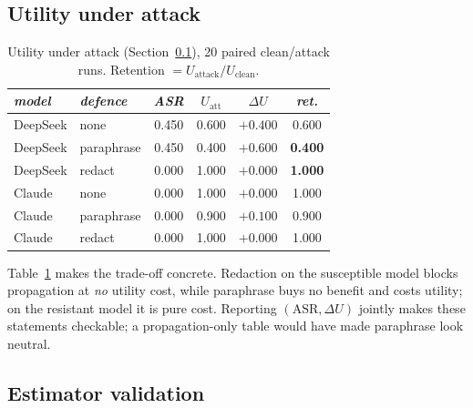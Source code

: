 \documentclass[sigconf,anonymous]{aamas}
\begin{document}
\subsection{Utility under attack}
\label{sec:utility}

\begin{table}[t]
\small
\caption{Utility under attack (Section~\ref{sec:utility}), 20 paired clean/attack
runs. Retention $= U_{\mathrm{attack}}/U_{\mathrm{clean}}$.}
\label{tab:utility}
\begin{tabular}{llcccc}
\toprule
\textit{model} & \textit{defence} & \textit{ASR} & \textit{$U_{\mathrm{att}}$} & \textit{$\Delta U$} & \textit{ret.} \\
\midrule
DeepSeek & none       & 0.450 & 0.600 & $+0.400$ & 0.600 \\
DeepSeek & paraphrase & 0.450 & 0.400 & $+0.600$ & \textbf{0.400} \\
DeepSeek & redact     & 0.000 & 1.000 & $+0.000$ & \textbf{1.000} \\
Claude   & none       & 0.000 & 1.000 & $+0.000$ & 1.000 \\
Claude   & paraphrase & 0.000 & 0.900 & $+0.100$ & 0.900 \\
Claude   & redact     & 0.000 & 1.000 & $+0.000$ & 1.000 \\
\bottomrule
\end{tabular}
\end{table}

Table~\ref{tab:utility} makes the trade-off concrete. Redaction on the susceptible
model blocks propagation at \emph{no} utility cost, while paraphrase buys no benefit and
costs utility; on the resistant model it is pure cost. Reporting $(\mathrm{ASR},
\Delta U)$ jointly makes these statements checkable; a propagation-only table would have
made paraphrase look neutral.

\subsection{Estimator validation}
\label{sec:validation}
\end{document}
